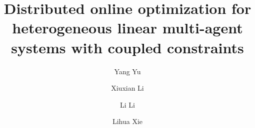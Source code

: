 \documentclass[final,5p,times,twocolumn,authoryear]{elsarticle}
\begin{document}
\begin{frontmatter}



\title{Distributed online optimization for heterogeneous linear multi-agent systems with coupled constraints }


\author[1,2]{Yang Yu}
\author[1,2,3]{Xiuxian Li}
\author[1,2,3]{Li Li}
\author[4]{Lihua Xie
	}

\address[1]{Department of Control Science and Engineering, College of Electronics and Information Engineering, Tongji University, Shanghai 201804, China}
\address[2]{Shanghai Research Institute for Intelligent Autonomous Systems, Shanghai, 201210, China}
\address[3]{Shanghai Institute of Intelligent Science and Technology, Tongji University, Shanghai 201804, China}
\address[4]{School of Electrical and Electronic Engineering, Nanyang Technological University, Singapore 639798}





\end{frontmatter}
\end{document}
